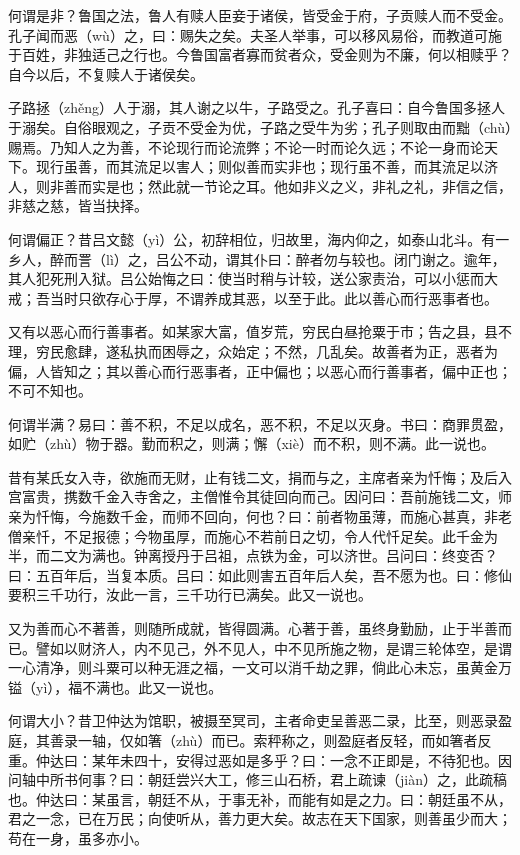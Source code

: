 \documentclass[12pt,UTF8]{ctexbook}
\begin{document}
何谓是非？鲁国之法，鲁人有赎人臣妾于诸侯，皆受金于府，子贡赎人而不受金。孔子闻而恶（wù）之，曰：赐失之矣。夫圣人举事，可以移风易俗，而教道可施于百姓，非独适己之行也。今鲁国富者寡而贫者众，受金则为不廉，何以相赎乎？自今以后，不复赎人于诸侯矣。

子路拯（zhěng）人于溺，其人谢之以牛，子路受之。孔子喜曰：自今鲁国多拯人于溺矣。自俗眼观之，子贡不受金为优，子路之受牛为劣；孔子则取由而黜（chù）赐焉。乃知人之为善，不论现行而论流弊；不论一时而论久远；不论一身而论天下。现行虽善，而其流足以害人；则似善而实非也；现行虽不善，而其流足以济人，则非善而实是也；然此就一节论之耳。他如非义之义，非礼之礼，非信之信，非慈之慈，皆当抉择。

何谓偏正？昔吕文懿（yì）公，初辞相位，归故里，海内仰之，如泰山北斗。有一乡人，醉而詈（lì）之，吕公不动，谓其仆曰：醉者勿与较也。闭门谢之。逾年，其人犯死刑入狱。吕公始悔之曰：使当时稍与计较，送公家责治，可以小惩而大戒；吾当时只欲存心于厚，不谓养成其恶，以至于此。此以善心而行恶事者也。

又有以恶心而行善事者。如某家大富，值岁荒，穷民白昼抢粟于市；告之县，县不理，穷民愈肆，遂私执而困辱之，众始定；不然，几乱矣。故善者为正，恶者为偏，人皆知之；其以善心而行恶事者，正中偏也；以恶心而行善事者，偏中正也；不可不知也。

何谓半满？易曰：善不积，不足以成名，恶不积，不足以灭身。书曰：商罪贯盈，如贮（zhù）物于器。勤而积之，则满；懈（xiè）而不积，则不满。此一说也。

昔有某氏女入寺，欲施而无财，止有钱二文，捐而与之，主席者亲为忏悔；及后入宫富贵，携数千金入寺舍之，主僧惟令其徒回向而己。因问曰：吾前施钱二文，师亲为忏悔，今施数千金，而师不回向，何也？曰：前者物虽薄，而施心甚真，非老僧亲忏，不足报德；今物虽厚，而施心不若前日之切，令人代忏足矣。此千金为半，而二文为满也。钟离授丹于吕祖，点铁为金，可以济世。吕问曰：终变否？曰：五百年后，当复本质。吕曰：如此则害五百年后人矣，吾不愿为也。曰：修仙要积三千功行，汝此一言，三千功行已满矣。此又一说也。

又为善而心不著善，则随所成就，皆得圆满。心著于善，虽终身勤励，止于半善而已。譬如以财济人，内不见己，外不见人，中不见所施之物，是谓三轮体空，是谓一心清净，则斗粟可以种无涯之福，一文可以消千劫之罪，倘此心未忘，虽黄金万镒（yì），福不满也。此又一说也。

何谓大小？昔卫仲达为馆职，被摄至冥司，主者命吏呈善恶二录，比至，则恶录盈庭，其善录一轴，仅如箸（zhù）而已。索秤称之，则盈庭者反轻，而如箸者反重。仲达曰：某年未四十，安得过恶如是多乎？曰：一念不正即是，不待犯也。因问轴中所书何事？曰：朝廷尝兴大工，修三山石桥，君上疏谏（jiàn）之，此疏稿也。仲达曰：某虽言，朝廷不从，于事无补，而能有如是之力。曰：朝廷虽不从，君之一念，已在万民；向使听从，善力更大矣。故志在天下国家，则善虽少而大；苟在一身，虽多亦小。
\end{document}

